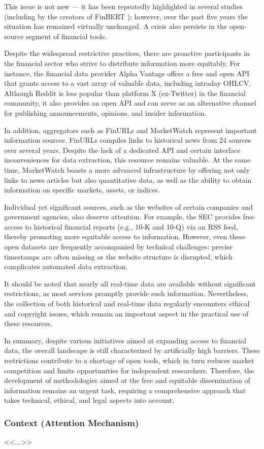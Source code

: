 This issue is not new --- it has been repeatedly highlighted in several studies (including by the creators of FinBERT \parencite{Yang2020FinBERT});
however, over the past five years the situation has remained virtually unchanged. A crisis also persists in the open-source segment of financial tools.

Despite the widespread restrictive practices, there are proactive participants in the financial sector who strive to distribute information
more equitably. For instance, the financial data provider Alpha Vantage offers a free and open API that grants access to a vast array of valuable
data, including intraday OHLCV. Although Reddit is less popular than platform X (ex-Twitter) in the financial community, it also provides an open API
and can serve as an alternative channel for publishing announcements, opinions, and insider information.

In addition, aggregators such as FinURLs and MarketWatch represent important information sources. FinURLs compiles links to historical news
from 24 sources over several years. Despite the lack of a dedicated API and certain interface inconveniences for data extraction, this resource
remains valuable. At the same time, MarketWatch boasts a more advanced infrastructure by offering not only links to news articles but also quantitative
data, as well as the ability to obtain information on specific markets, assets, or indices.

Individual yet significant sources, such as the websites of certain companies and government agencies, also deserve attention. For example,
the SEC provides free access to historical financial reports (e.g., 10-K and 10-Q) via an RSS feed, thereby promoting more equitable access
to information. However, even these open datasets are frequently accompanied by technical challenges: precise timestamps are often missing
or the website structure is disrupted, which complicates automated data extraction.

It should be noted that nearly all real-time data are available without significant restrictions, as most services promptly provide such information.
Nevertheless, the collection of both historical and real-time data regularly encounters ethical and copyright issues, which remain an important aspect
in the practical use of these resources.

In summary, despite various initiatives aimed at expanding access to financial data, the overall landscape is still characterized by artificially
high barriers. These restrictions contribute to a shortage of open tools, which in turn reduces market competition and limits opportunities
for independent researchers. Therefore, the development of methodologies aimed at the free and equitable dissemination of information remains
an urgent task, requiring a comprehensive approach that takes technical, ethical, and legal aspects into account.

\subsubsection{Context (Attention Mechanism)}
<<...>>